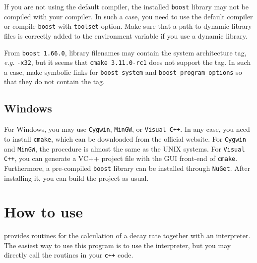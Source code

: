 \documentclass[12pt]{article}
\begin{document}
If you are not using the default compiler, the installed \verb|boost|
library may not be compiled with your compiler. In such a case, you need
to use the default compiler or compile \verb|boost| with \verb|toolset|
option. Make sure that a path to dynamic library files is correctly
added to the environment variable if you use a dynamic library.

From
\verb|boost 1.66.0|, library filenames may contain the system architecture tag, {\it e.g.} \verb|-x32|, but it seems that \verb|cmake 3.11.0-rc1|
does not support the tag. In such a case, make symbolic links for
\verb|boost_system| and \verb|boost_program_options| so that they do not
contain the tag.
\subsection{Windows}
For Windows, you may use
\verb|Cygwin|, \verb|MinGW|, or \verb|Visual C++|.  In any case, you
need to install \verb|cmake|, which can be downloaded from the official
website.  For \verb|Cygwin| and \verb|MinGW|, the procedure is almost
the same as the UNIX systems.  For
\verb|Visual C++|, you can generate a VC++ project file with the GUI front-end of \verb|cmake|.
Furthermore, a pre-compiled
\verb|boost| library can be installed through \verb|NuGet|. After
installing it, you can build the project as usual.

\section{How to use \codename}

\codename provides routines for the calculation of a decay rate together
with an interpreter. The easiest way to use this program is to use the
interpreter, but you may directly call the routines in your {\tt c++}
code.
\end{document}
